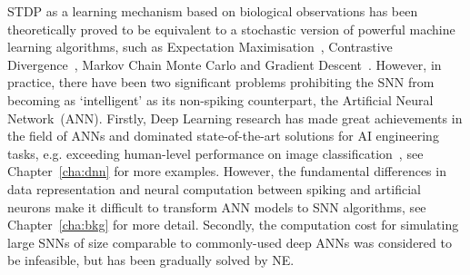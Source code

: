 STDP as a learning mechanism based on biological observations has been theoretically proved to be equivalent to a stochastic version of powerful machine learning algorithms, such as Expectation Maximisation~\citep{nessler2013bayesian}, Contrastive Divergence~\citep{neftci2013event}, Markov Chain Monte Carlo \citep{buesing2011neural} and Gradient Descent~\citep{o2016deep}.
However, in practice, there have been two significant problems prohibiting the SNN from becoming as `intelligent' as its non-spiking counterpart, the Artificial Neural Network~(ANN).
Firstly, Deep Learning research has made great achievements in the field of ANNs and dominated state-of-the-art solutions for AI engineering tasks, e.g. exceeding human-level performance on image classification~\citep{he2015delving}, see Chapter~\ref{cha:dnn} for more examples.
However, the fundamental differences in data representation and neural computation between spiking and artificial neurons make it difficult to transform ANN models to SNN algorithms, see Chapter~\ref{cha:bkg} for more detail.
Secondly, the computation cost for simulating large SNNs of size comparable to commonly-used deep ANNs was considered to be infeasible, but has been gradually solved by NE.

